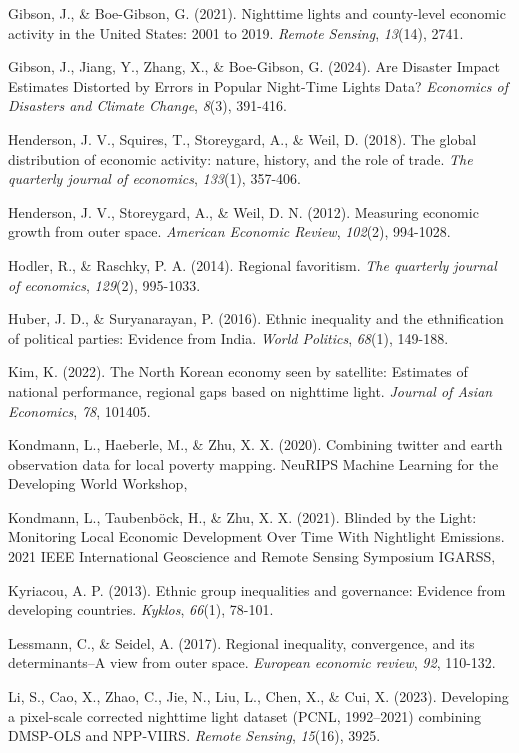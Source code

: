 Gibson, J., \& Boe-Gibson, G. (2021). Nighttime lights and county-level
economic activity in the United States: 2001 to 2019. \emph{Remote
Sensing}, \emph{13}(14), 2741.

Gibson, J., Jiang, Y., Zhang, X., \& Boe-Gibson, G. (2024). Are Disaster
Impact Estimates Distorted by Errors in Popular Night-Time Lights Data?
\emph{Economics of Disasters and Climate Change}, \emph{8}(3), 391-416.

Henderson, J. V., Squires, T., Storeygard, A., \& Weil, D. (2018). The
global distribution of economic activity: nature, history, and the role
of trade. \emph{The quarterly journal of economics}, \emph{133}(1),
357-406.

Henderson, J. V., Storeygard, A., \& Weil, D. N. (2012). Measuring
economic growth from outer space. \emph{American Economic Review},
\emph{102}(2), 994-1028.

Hodler, R., \& Raschky, P. A. (2014). Regional favoritism. \emph{The
quarterly journal of economics}, \emph{129}(2), 995-1033.

Huber, J. D., \& Suryanarayan, P. (2016). Ethnic inequality and the
ethnification of political parties: Evidence from India. \emph{World
Politics}, \emph{68}(1), 149-188.

Kim, K. (2022). The North Korean economy seen by satellite: Estimates of
national performance, regional gaps based on nighttime light.
\emph{Journal of Asian Economics}, \emph{78}, 101405.

Kondmann, L., Haeberle, M., \& Zhu, X. X. (2020). Combining twitter and
earth observation data for local poverty mapping. NeuRIPS Machine
Learning for the Developing World Workshop,

Kondmann, L., Taubenböck, H., \& Zhu, X. X. (2021). Blinded by the
Light: Monitoring Local Economic Development Over Time With Nightlight
Emissions. 2021 IEEE International Geoscience and Remote Sensing
Symposium IGARSS,

Kyriacou, A. P. (2013). Ethnic group inequalities and governance:
Evidence from developing countries. \emph{Kyklos}, \emph{66}(1), 78-101.

Lessmann, C., \& Seidel, A. (2017). Regional inequality, convergence,
and its determinants--A view from outer space. \emph{European economic
review}, \emph{92}, 110-132.

Li, S., Cao, X., Zhao, C., Jie, N., Liu, L., Chen, X., \& Cui, X.
(2023). Developing a pixel-scale corrected nighttime light dataset
(PCNL, 1992--2021) combining DMSP-OLS and NPP-VIIRS. \emph{Remote
Sensing}, \emph{15}(16), 3925.

